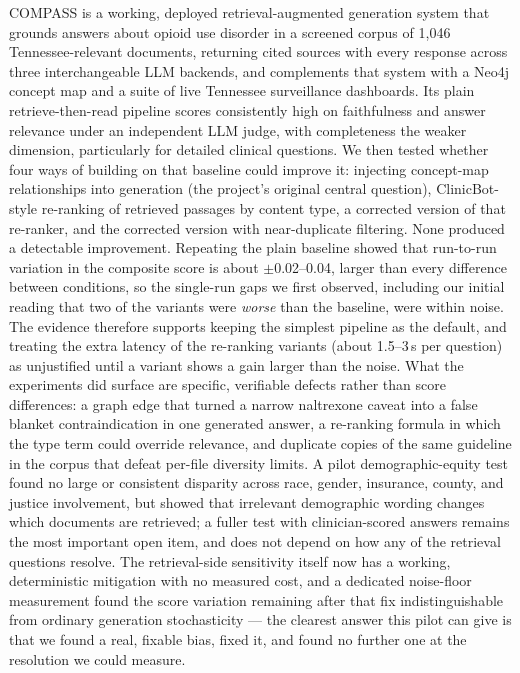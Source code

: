 \documentclass[11pt]{article}
\begin{document}
COMPASS is a working, deployed retrieval-augmented generation system that grounds answers about opioid use disorder in a screened corpus of 1{,}046 Tennessee-relevant documents, returning cited sources with every response across three interchangeable LLM backends, and complements that system with a Neo4j concept map and a suite of live Tennessee surveillance dashboards. Its plain retrieve-then-read pipeline scores consistently high on faithfulness and answer relevance under an independent LLM judge, with completeness the weaker dimension, particularly for detailed clinical questions. We then tested whether four ways of building on that baseline could improve it: injecting concept-map relationships into generation (the project's original central question), ClinicBot-style re-ranking of retrieved passages by content type, a corrected version of that re-ranker, and the corrected version with near-duplicate filtering. None produced a detectable improvement. Repeating the plain baseline showed that run-to-run variation in the composite score is about $\pm$0.02--0.04, larger than every difference between conditions, so the single-run gaps we first observed, including our initial reading that two of the variants were \emph{worse} than the baseline, were within noise. The evidence therefore supports keeping the simplest pipeline as the default, and treating the extra latency of the re-ranking variants (about 1.5--3\,s per question) as unjustified until a variant shows a gain larger than the noise. What the experiments did surface are specific, verifiable defects rather than score differences: a graph edge that turned a narrow naltrexone caveat into a false blanket contraindication in one generated answer, a re-ranking formula in which the type term could override relevance, and duplicate copies of the same guideline in the corpus that defeat per-file diversity limits. A pilot demographic-equity test found no large or consistent disparity across race, gender, insurance, county, and justice involvement, but showed that irrelevant demographic wording changes which documents are retrieved; a fuller test with clinician-scored answers remains the most important open item, and does not depend on how any of the retrieval questions resolve. The retrieval-side sensitivity itself now has a working, deterministic mitigation with no measured cost, and a dedicated noise-floor measurement found the score variation remaining after that fix indistinguishable from ordinary generation stochasticity --- the clearest answer this pilot can give is that we found a real, fixable bias, fixed it, and found no further one at the resolution we could measure.
\end{document}
